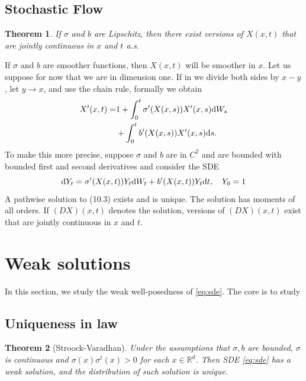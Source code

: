 \documentclass[twoside, 12pt]{book}
\numberwithin{equation}{chapter}
\newtheorem{theorem}{Theorem}[section]
\def\mR{{\mathbb R}}
\def\d{\text{\rm{d}}}
\begin{document}
	\subsection{Stochastic Flow}

    \begin{theorem}
        If $\sigma$ and $b$ are Lipschitz, then there exist versions of $X(x, t)$ that are jointly continuous in $x$ and $t$ a.s.
    \end{theorem}
	
    If $\sigma$ and $b$ are smoother functions, then $X(x, t)$ will be smoother in $x$. Let us suppose for now that we are in dimension one. If in  we divide both sides by $x-y$, let $y \rightarrow x$, and use the chain rule, formally we obtain
    \[
        \begin{aligned}
            X'(x, t) = & 1  +\int_0^t \sigma^{\prime}(X(x, s)) X'(x, s) \d W_s\\
            & +\int_0^t b^{\prime}(X(x, s))X'(x, s) \d s .
        \end{aligned}
    \]
    To make this more precise, suppose $\sigma$ and $b$ are in $C^2$ and are bounded with bounded first and second derivatives and consider the SDE 
    \[
        \d Y_t=\sigma^{\prime}(X(x, t)) Y_t \d W_t+b^{\prime}(X(x, t)) Y_t \d t, \quad Y_0=1
    \]
    A pathwise solution to (10.3) exists and is unique. The solution has moments of all orders. If $(D X)(x, t)$ denotes the solution, versions of $(D X)(x, t)$ exist that are jointly continuous in $x$ and $t$.


	
	\section{Weak solutions}
	
	In this section, we study the weak well-posedness of \eqref{eq:sde}. The core is to study 
	
	\subsection{Uniqueness in law}
	\begin{theorem}[Stroock-Varadhan]\label{thm:SV}
		 Under the assumptions that $\sigma, b$ are bounded, $\sigma$ is continuous and  $\sigma(x)\sigma^t(x)>0$ for each $x\in \mR^d$. Then SDE  \eqref{eq:sde} has a weak solution, and the distribution of such solution is unique. 
	\end{theorem}
	
\end{document}
